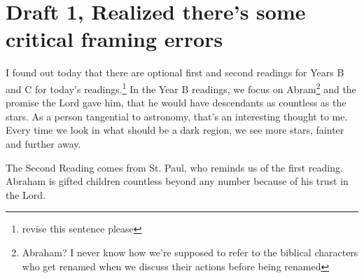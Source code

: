 \documentclass[12pt]{article}[titlepage]
\newcommand{\1}{\={a}}
\newcommand{\2}{\={e}}
\newcommand{\3}{\={\i}}
\newcommand{\4}{\=o}
\newcommand{\5}{\=u}
\newcommand{\6}{\={A}}
\renewcommand{\,}{\textsuperscript{,}}
\begin{document}
\section{Draft 1, Realized there's some critical framing errors}
I found out today that there are optional first and second readings for Years B and C for today's readings.\footnote{revise this sentence please}
In the Year B readings, we focus on Abram\footnote{Abraham? I never know how we're supposed to refer to the biblical characters who get renamed when we discuss their actions before being renamed} and the promise the Lord gave him, that he would have descendants as countless as the stars.
As a person tangential to astronomy, that's an interesting thought to me.
Every time we look in what should be a dark region, we see more stars, fainter and further away.

The Second Reading comes from St. Paul, who reminds us of the first reading.
Abraham is gifted children countless beyond any number because of his trust in the Lord.
\end{document}
